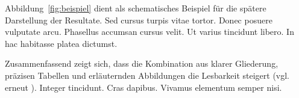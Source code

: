 \begin{A3}
Abbildung~\ref{fig:beispiel} dient als schematisches Beispiel für die spätere Darstellung 
der Resultate. Sed cursus turpis vitae tortor. Donec posuere vulputate arcu. 
Phasellus accumsan cursus velit. Ut varius tincidunt libero. 
In hac habitasse platea dictumst.
\end{A3}

\begin{A1}
Zusammenfassend zeigt sich, dass die Kombination aus klarer Gliederung, 
präzisen Tabellen und erläuternden Abbildungen die Lesbarkeit steigert 
(vgl. erneut \cite{knuth1984}). Integer tincidunt. Cras dapibus. Vivamus elementum semper nisi.
\end{A1}
